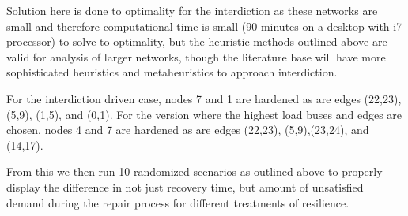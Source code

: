 \documentclass{article}
\begin{document}
	Solution here is done to optimality for the interdiction as these networks are small and therefore computational time is small (90 minutes on a desktop with i7 processor) to solve to optimality, but the heuristic methods outlined above are valid for analysis of larger networks, though the literature base will have more sophisticated heuristics and metaheuristics to approach interdiction.
	
	For the interdiction driven case, nodes 7 and 1 are hardened as are edges (22,23), (5,9), (1,5), and (0,1). For the version where the highest load buses and edges are chosen, nodes 4 and 7 are hardened as are edges (22,23), (5,9),(23,24), and (14,17).
	
	From this we then run 10 randomized scenarios as outlined above to properly display the difference in not just recovery time, but amount of unsatisfied demand during the repair process for different treatments of resilience.
	
\end{document}

